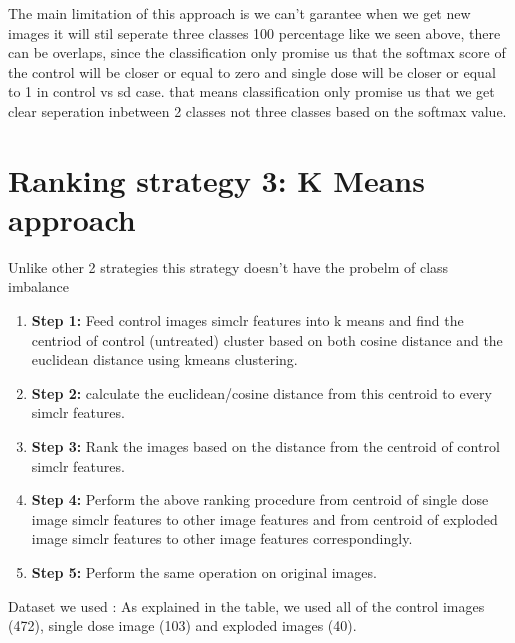 The main limitation of this approach is we can't garantee when we get new images it will stil seperate three classes 100 percentage like we seen above, there can be overlaps, since the classification only promise us that the softmax score of the control will be closer or equal to zero and  single dose will be closer or equal to 1 in control vs sd case. that means classification only promise us that we get clear seperation inbetween 2 classes not three classes based on the softmax value.



\section{Ranking strategy 3: K Means approach}

Unlike other 2 strategies this strategy doesn't have the probelm of class imbalance

\begin{enumerate}
  \item \textbf{Step 1:} Feed control images simclr features into k means and find the centriod of control (untreated) cluster based on both cosine distance and the euclidean distance using kmeans clustering. 
 
  
  \item \textbf{Step 2:} calculate the euclidean/cosine distance from this centroid to every simclr features.
  \item \textbf{Step 3:} Rank the images based on the distance from the centroid of control simclr features.
  \item \textbf{Step 4:} Perform the above ranking procedure from centroid of single dose image simclr features to other image features and from centroid of exploded image simclr features to other image features correspondingly.
  
  \item \textbf{Step 5:} Perform the same operation  on original images.
\end{enumerate}


Dataset we used : As explained in the table, we used all of the control images (472),
single dose image (103) and exploded images (40).

